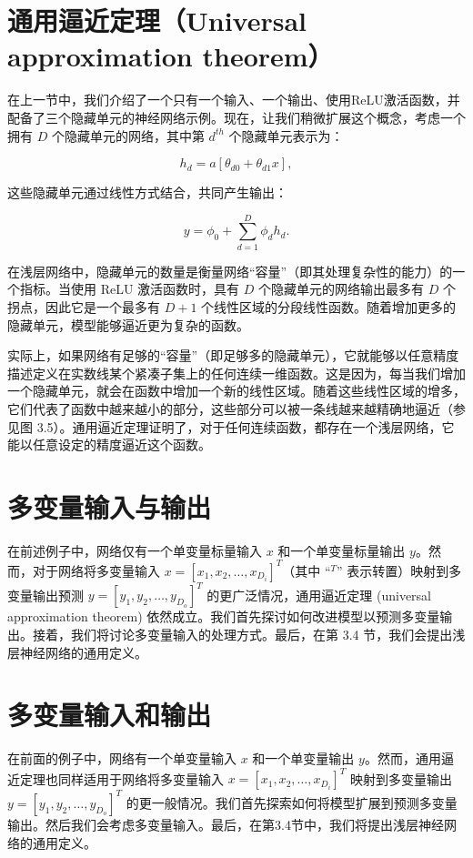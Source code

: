 \section{通用逼近定理（Universal approximation theorem）}
在上一节中，我们介绍了一个只有一个输入、一个输出、使用ReLU激活函数，并配备了三个隐藏单元的神经网络示例。现在，让我们稍微扩展这个概念，考虑一个拥有 \(D\) 个隐藏单元的网络，其中第 \(d^{th}\) 个隐藏单元表示为：

\[
h_d = a[\theta_{d0} + \theta_{d1}x], \tag{3.5}
\]

这些隐藏单元通过线性方式结合，共同产生输出：


\[
y = \phi_0 + \sum_{d=1}^{D} \phi_dh_d. \tag{3.6}
\]

在浅层网络中，隐藏单元的数量是衡量网络“容量”（即其处理复杂性的能力）的一个指标。当使用 ReLU 激活函数时，具有 \(D\) 个隐藏单元的网络输出最多有 \(D\) 个拐点，因此它是一个最多有 \(D + 1\) 个线性区域的分段线性函数。随着增加更多的隐藏单元，模型能够逼近更为复杂的函数。

实际上，如果网络有足够的“容量”（即足够多的隐藏单元），它就能够以任意精度描述定义在实数线某个紧凑子集上的任何连续一维函数。这是因为，每当我们增加一个隐藏单元，就会在函数中增加一个新的线性区域。随着这些线性区域的增多，它们代表了函数中越来越小的部分，这些部分可以被一条线越来越精确地逼近（参见图 3.5）。通用逼近定理证明了，对于任何连续函数，都存在一个浅层网络，它能以任意设定的精度逼近这个函数。

\section{多变量输入与输出}
在前述例子中，网络仅有一个单变量标量输入 \(x\) 和一个单变量标量输出 \(y\)。然而，对于网络将多变量输入 \(x = [x_1, x_2, \dots, x_{D_i}]^T\)（其中 “\(^T\)” 表示转置）映射到多变量输出预测 \(y = [y_1, y_2, \dots, y_{D_o}]^T\) 的更广泛情况，通用逼近定理 (universal approximation theorem) 依然成立。我们首先探讨如何改进模型以预测多变量输出。接着，我们将讨论多变量输入的处理方式。最后，在第 3.4 节，我们会提出浅层神经网络的通用定义。
\section{多变量输入和输出}
在前面的例子中，网络有一个单变量输入 \(x\) 和一个单变量输出 \(y\)。然而，通用逼近定理也同样适用于网络将多变量输入 \(x = [x_1, x_2, \dots, x_{D_i}]^T\) 映射到多变量输出 \(y = [y_1, y_2, \dots, y_{D_o}]^T\) 的更一般情况。我们首先探索如何将模型扩展到预测多变量输出。然后我们会考虑多变量输入。最后，在第3.4节中，我们将提出浅层神经网络的通用定义。
